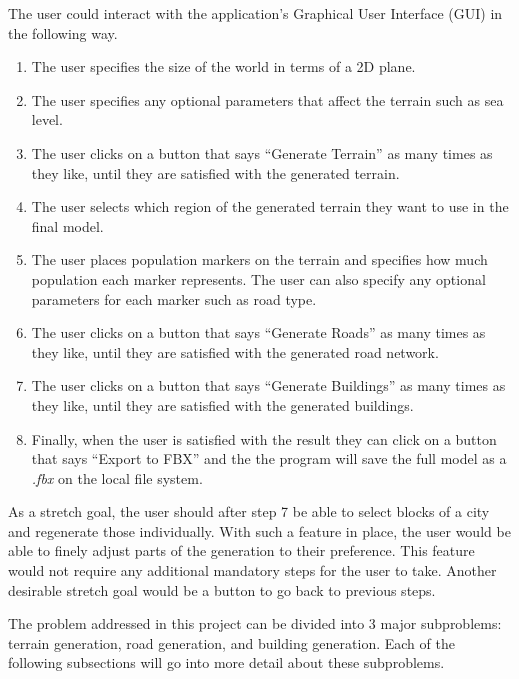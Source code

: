 The user could interact with the application's Graphical User Interface (GUI) in the following way.
\begin{enumerate}
  \item The user specifies the size of the world in terms of a 2D plane.
  \item The user specifies any optional parameters that affect the terrain
    such as sea level.
  \item The user clicks on a button that says ``Generate Terrain'' as many times
    as they like, until they are satisfied with the generated terrain.
  \item The user selects which region of the generated terrain they want to use in the final model.
  \item The user places population markers on the terrain and specifies how much
    population each marker represents. The user can also specify any optional
    parameters for each marker such as road type.
  \item The user clicks on a button that says ``Generate Roads'' as many times
    as they like, until they are satisfied with the generated road network.
  \item The user clicks on a button that says ``Generate Buildings'' as many times
    as they like, until they are satisfied with the generated buildings.
  \item Finally, when the user is satisfied with the result they can click on a
    button that says ``Export to FBX'' and the the program will save the full
    model as a \textit{.fbx} on the local file system.
\end{enumerate}

As a stretch goal, the user should after step 7 be able to select blocks of a city and regenerate those individually.
With such a feature in place, the user would be able to finely adjust parts of the generation to their preference.
This feature would not require any additional mandatory steps for the user to take.
Another desirable stretch goal would be a button to go back to previous steps.

The problem addressed in this project can be divided into 3 major subproblems: terrain generation, road generation, and building generation.
Each of the following subsections will go into more detail about these subproblems.

\newpage

\newpage

\newpage
